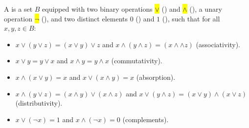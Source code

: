 \begin{definition} \label{definition:boolean_algebra}
A  is a set $B$ equipped with two binary operations \hl{$\lor$} () and \hl{$\land$} (), a unary operation \hl{$\neg$} (), and two distinct elements $0$ () and $1$ (), such that for all $x, y, z \in B$:
\begin{itemize}
    \item $x \lor (y \lor z) = (x \lor y) \lor z$ and $x \land (y \land z) = (x \land \land z)$ (associativity).
    \item $x \lor y = y \lor x$ and $x \land y = y \land x$ (commutativity).
    \item $x \land (x \lor y) = x$ and $x \lor (x \land y) = x$ (absorption).
    \item $x \land (y \lor z) = (x \land y) \lor (x \land z)$ and $x \lor (y \land z) = (x \lor y) \land (x \lor z)$ (distributivity).
    \item $x \lor (\neg x) = 1$ and $x \land (\neg x) = 0$ (complements).
\end{itemize}
\end{definition}